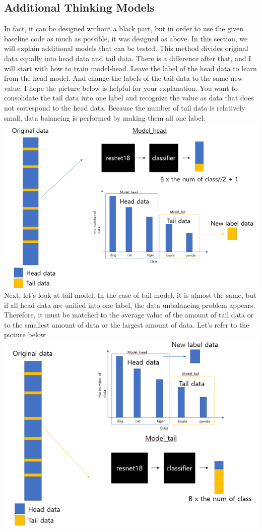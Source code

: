 \documentclass[extendedabs]{bmvc2k}
\begin{document}
  \subsection{Additional Thinking Models}
    \quad In fact, it can be designed without a black part, but in order to use the given baseline code as much as possible, it was designed as above. 
    In this section, we will explain additional models that can be tested. This method divides original data equally into head data and tail data. 
    There is a difference after that, and I will start with how to train model-head. Leave the label of the head data to learn from the head-model. 
    And change the labels of the tail data to the same new value. I hope the picture below is helpful for your explanation. 
    You want to consolidate the tail data into one label and recognize the value as data that does not correspond to the head data. 
    Because the number of tail data is relatively small, data balancing is performed by making them all one label.
    \newline  \includegraphics[width=\linewidth]{images/09_project.PNG}
    Next, let's look at tail-model. In the case of tail-model, it is almost the same, but if all head data are unified into one label, the data unbalancing problem appears. 
    Therefore, it must be matched to the average value of the amount of tail data or to the smallest amount of data or the largest amount of data. Let's refer to the picture below
    \newline  \includegraphics[width=\linewidth]{images/10_project.PNG}
\end{document}
